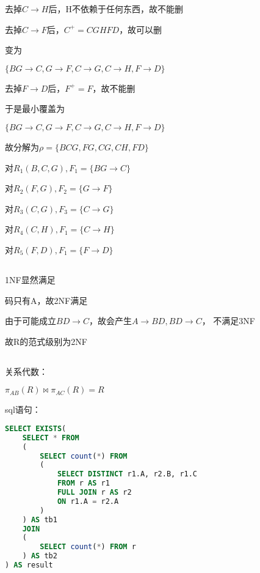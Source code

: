 \documentclass[UTF8]{ctexart}
\begin{document}
去掉$C\rightarrow H$后，H不依赖于任何东西，故不能删

去掉$C\rightarrow F$后，$C^+ = CGHFD$，故可以删

变为

$\{
    BG\rightarrow C, 
    G\rightarrow F, 
    C\rightarrow G, 
    C\rightarrow H,  
    F\rightarrow D
\}$

去掉$F\rightarrow D$后，$F^+ = F$，故不能删

于是最小覆盖为

$\{
    BG\rightarrow C, 
    G\rightarrow F, 
    C\rightarrow G, 
    C\rightarrow H,  
    F\rightarrow D
\}$

故分解为$\rho = \{BCG, FG, CG, CH, FD\}$

对$R_1(B, C, G), F_1 = \{BG\rightarrow C\}$

对$R_2(F, G), F_2 = \{G\rightarrow F\}$

对$R_3(C, G), F_3 = \{C\rightarrow G\}$

对$R_4(C, H), F_1 = \{C\rightarrow H\}$

对$R_5(F, D), F_1 = \{F\rightarrow D\}$

\subsection{}

1NF显然满足

码只有A，故2NF满足

由于可能成立$BD\rightarrow C$，故会产生$A\rightarrow BD, BD\rightarrow C$，
不满足3NF

故R的范式级别为2NF

\subsection{}

关系代数：

$\pi_{AB}(R)\bowtie \pi_{AC}(R) = R$

sql语句：

\begin{lstlisting}[language=sql]
SELECT EXISTS(
    SELECT * FROM 
    (
        SELECT count(*) FROM
        (
            SELECT DISTINCT r1.A, r2.B, r1.C 
            FROM r AS r1
            FULL JOIN r AS r2
            ON r1.A = r2.A
        ) 
    ) AS tb1
    JOIN
    (
        SELECT count(*) FROM r
    ) AS tb2
) AS result
\end{lstlisting}

\subsection{}
\end{document}
